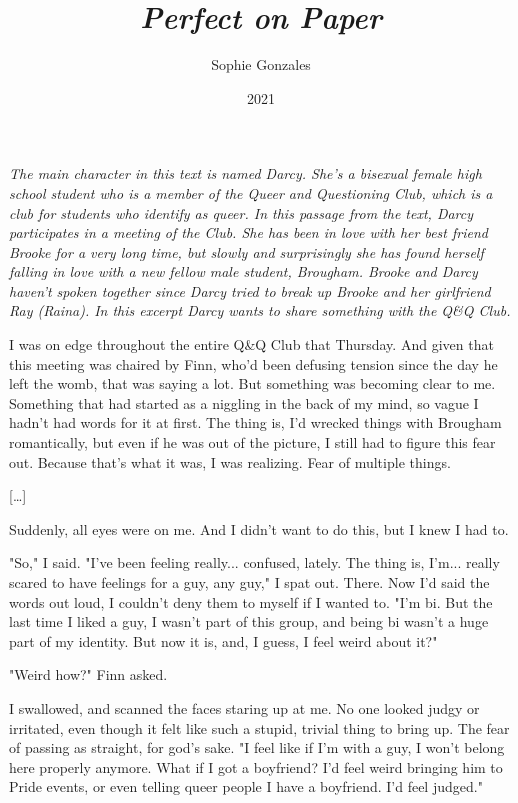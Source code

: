 \documentclass[10pt,a4paper]{article}
\begin{document}
\title{\textit{Perfect on Paper}}
\date{2021}
\author{Sophie Gonzales}

\maketitle

\noindent\textit{The main character in this text is named Darcy. She's a bisexual female high school student who is a member of the Queer and Questioning Club, which is a club for students who identify as queer. In this passage from the text, Darcy participates in a meeting of the Club. She has been in love with her best friend Brooke for a very long time, but slowly and surprisingly she has found herself falling in love with a new fellow male student, Brougham. Brooke and Darcy haven't spoken together since Darcy tried to break up Brooke and her girlfriend Ray (Raina). In this excerpt Darcy wants to share something with the Q\&Q Club.}

\bigskip

\noindent\linenumbers I was on edge throughout the entire Q\&Q Club that Thursday. And given that this meeting was chaired by Finn, who'd been defusing tension since the day he left the womb, that was saying a lot. But something was becoming clear to me. Something that had started as a niggling in the back of my mind, so vague I hadn't had words for it at first. The thing is, I'd wrecked things with Brougham romantically, but even if he was out of the picture, I still had to figure this fear out. Because that's what it was, I was realizing. Fear of multiple things.

[\ldots]

Suddenly, all eyes were on me. And I didn't want to do this, but I knew I had to.

"So," I said. "I've been feeling really... confused, lately. The thing is, I'm... really scared to have feelings for a guy, any guy," I spat out. There. Now I'd said the words out loud, I couldn't deny them to myself if I wanted to. "I'm bi. But the last time I liked a guy, I wasn't part of this group, and being bi wasn't a huge part of my identity. But now it is, and, I guess, I feel weird about it?"

"Weird how?" Finn asked.

I swallowed, and scanned the faces staring up at me. No one looked judgy or irritated, even though it felt like such a stupid, trivial thing to bring up. The fear of passing as straight, for god's sake. "I feel like if I'm with a guy, I won't belong here properly anymore. What if I got a boyfriend? I'd feel weird bringing him to Pride events, or even telling queer people I have a boyfriend. I'd feel judged."
\end{document}
